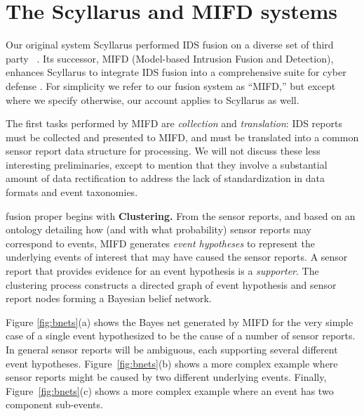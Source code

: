 \section{The Scyllarus and MIFD systems}
\label{sec:mifd}

Our original system Scyllarus
performed IDS
fusion on a diverse set of third party \idses~.
Its successor,
MIFD (Model-based Intrusion Fusion and Detection),
enhances Scyllarus
 to integrate
IDS fusion into a comprehensive suite for cyber defense
.
For simplicity we refer to our \ids fusion system as ``MIFD,'' but
except where we specify otherwise, our account applies to Scyllarus as well.

The first tasks performed by MIFD are
\emph{collection} and \emph{translation}: IDS reports
must be collected and presented to MIFD, and
must be translated into a common
sensor report data structure for processing.
We will not discuss these less interesting
preliminaries, except to mention that they
involve a substantial amount of data rectification
 to address the lack of standardization in data formats and event taxonomies.

{\ids} fusion proper begins with
\textbf{Clustering.} From the
sensor reports,
and based on an ontology detailing how (and with what probability)
sensor reports may correspond to events,
MIFD generates \emph{event hypotheses} to represent the
underlying events of interest that may have caused the sensor reports.  A
sensor report that provides evidence for an event hypothesis is a
\emph{supporter}.
The clustering process constructs a
directed graph of event hypothesis and sensor report nodes forming a
Bayesian belief network.

Figure \ref{fig:bnets}(a) shows the Bayes net generated by MIFD for
the very simple case of a single event hypothesized to be the cause of
a number of sensor reports.  In general sensor reports will be
ambiguous, each supporting several different event hypotheses.
Figure~\ref{fig:bnets}(b) shows a more complex example where sensor reports
might be caused by two different underlying events.
Finally, Figure~\ref{fig:bnets}(c) shows a more complex example where an event
has two component sub-events.

